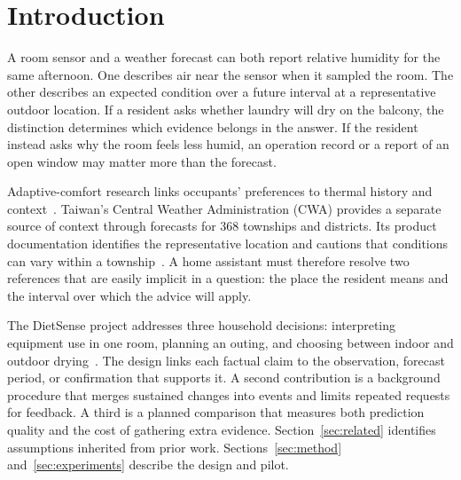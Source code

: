 \section{Introduction}\label{sec:intro}
A room sensor and a weather forecast can both report relative humidity for the same afternoon. One describes air near the sensor when it sampled the room. The other describes an expected condition over a future interval at a representative outdoor location. If a resident asks whether laundry will dry on the balcony, the distinction determines which evidence belongs in the answer. If the resident instead asks why the room feels less humid, an operation record or a report of an open window may matter more than the forecast.

Adaptive-comfort research links occupants' preferences to thermal history and context~\cite{deDear}. Taiwan's Central Weather Administration (CWA) provides a separate source of context through forecasts for 368 townships and districts. Its product documentation identifies the representative location and cautions that conditions can vary within a township~\cite{cwa}. A home assistant must therefore resolve two references that are easily implicit in a question: the place the resident means and the interval over which the advice will apply.

The DietSense project addresses three household decisions: interpreting equipment use in one room, planning an outing, and choosing between indoor and outdoor drying~\cite{project}. The design links each factual claim to the observation, forecast period, or confirmation that supports it. A second contribution is a background procedure that merges sustained changes into events and limits repeated requests for feedback. A third is a planned comparison that measures both prediction quality and the cost of gathering extra evidence. Section~\ref{sec:related} identifies assumptions inherited from prior work. Sections~\ref{sec:method} and~\ref{sec:experiments} describe the design and pilot.
